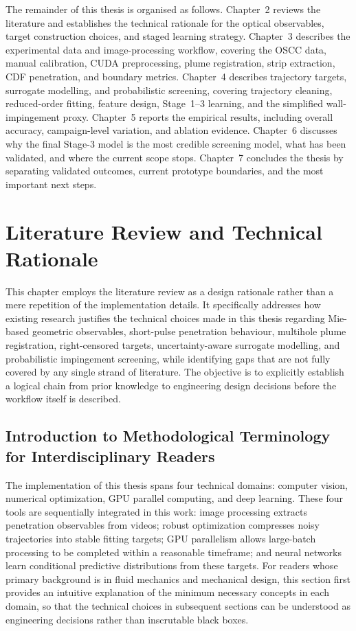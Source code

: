 \documentclass[english, 12pt, a4paper, elec, utf8, a-2b, online]{aaltothesis}
\begin{document}
The remainder of this thesis is organised as follows. Chapter~2 reviews the literature and establishes the technical rationale for the optical observables, target construction choices, and staged learning strategy. Chapter~3 describes the experimental data and image-processing workflow, covering the OSCC data, manual calibration, CUDA preprocessing, plume registration, strip extraction, CDF penetration, and boundary metrics. Chapter~4 describes trajectory targets, surrogate modelling, and probabilistic screening, covering trajectory cleaning, reduced-order fitting, feature design, Stage~1--3 learning, and the simplified wall-impingement proxy. Chapter~5 reports the empirical results, including overall accuracy, campaign-level variation, and ablation evidence. Chapter~6 discusses why the final Stage-3 model is the most credible screening model, what has been validated, and where the current scope stops. Chapter~7 concludes the thesis by separating validated outcomes, current prototype boundaries, and the most important next steps.

\section{Literature Review and Technical Rationale}

This chapter employs the literature review as a design rationale rather than a mere repetition of the implementation details. It specifically addresses how existing research justifies the technical choices made in this thesis regarding Mie-based geometric observables, short-pulse penetration behaviour, multihole plume registration, right-censored targets, uncertainty-aware surrogate modelling, and probabilistic impingement screening, while identifying gaps that are not fully covered by any single strand of literature. The objective is to explicitly establish a logical chain from prior knowledge to engineering design decisions before the workflow itself is described.
\subsection{Introduction to Methodological Terminology for Interdisciplinary Readers}\label{sec:methods-terminology}

The implementation of this thesis spans four technical domains: 
computer vision, numerical optimization, GPU parallel computing, and deep learning. 
These four tools are sequentially integrated in this work: 
image processing extracts penetration observables from videos; 
robust optimization compresses noisy trajectories into stable fitting targets; 
GPU parallelism allows large-batch processing to be completed within a reasonable timeframe; 
and neural networks learn conditional predictive distributions from these targets. 
For readers whose primary background is in fluid mechanics and mechanical design, 
this section first provides an intuitive explanation of the minimum necessary concepts 
in each domain, 
so that the technical choices in subsequent sections can be understood 
as engineering decisions rather than inscrutable black boxes.
\end{document}
